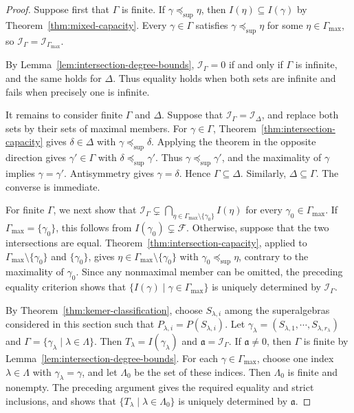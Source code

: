 \documentclass[11pt,reqno]{amsart}
\newcommand{\F}{\mathcal F}
\theoremstyle{definition}
\theoremstyle{remark}
\numberwithin{equation}{section}
\begin{document}
\begin{proof}
Suppose first that $\Gamma$ is finite.
If $\gamma\preceq_{\mathrm{sup}}\eta$, then
$I(\eta)\subseteq I(\gamma)$ by
Theorem~\ref{thm:mixed-capacity}.
Every $\gamma\in\Gamma$ satisfies
$\gamma\preceq_{\mathrm{sup}}\eta$ for some
$\eta\in\Gamma_{\max}$, so
$\mathcal I_\Gamma=\mathcal I_{\Gamma_{\max}}$.


By Lemma~\ref{lem:intersection-degree-bounds},
$\mathcal I_\Gamma=0$ if and only if $\Gamma$ is
infinite, and the same holds for $\Delta$.
Thus equality holds when both sets are infinite and
fails when precisely one is infinite.

It remains to consider finite $\Gamma$ and $\Delta$.
Suppose that $\mathcal I_\Gamma=\mathcal I_\Delta$,
and replace both sets by their sets of maximal members.
For $\gamma\in\Gamma$,
Theorem~\ref{thm:intersection-capacity} gives
$\delta\in\Delta$ with
$\gamma\preceq_{\mathrm{sup}}\delta$.
Applying the theorem in the opposite direction gives
$\gamma'\in\Gamma$ with
$\delta\preceq_{\mathrm{sup}}\gamma'$.
Thus $\gamma\preceq_{\mathrm{sup}}\gamma'$,
and the maximality of $\gamma$ implies
$\gamma=\gamma'$.
Antisymmetry  gives $\gamma=\delta$.
Hence $\Gamma\subseteq\Delta$. Similarly, $\Delta \subseteq \Gamma$.
The converse is immediate.

For finite $\Gamma$, we next show that
$\mathcal I_\Gamma\subsetneq
\bigcap_{\eta\in\Gamma_{\max}\setminus\{\gamma_0\}}I(\eta)$
for every $\gamma_0\in\Gamma_{\max}$.
If $\Gamma_{\max}=\{\gamma_0\}$, this follows from
$I(\gamma_0)\subsetneq\F$.
Otherwise, suppose that the two intersections are equal.
Theorem~\ref{thm:intersection-capacity}, applied to
$\Gamma_{\max}\setminus\{\gamma_0\}$ and
$\{\gamma_0\}$, gives
$\eta\in\Gamma_{\max}\setminus\{\gamma_0\}$ with
$\gamma_0\preceq_{\mathrm{sup}}\eta$,
contrary to the maximality of $\gamma_0$.
Since any nonmaximal member can be omitted,
the preceding equality criterion shows that
$\{I(\gamma)\mid\gamma\in\Gamma_{\max}\}$
is uniquely determined by $\mathcal I_\Gamma$.

By Theorem~\ref{thm:kemer-classification}, choose
$S_{\lambda,i}$ among the superalgebras considered
in this section such that
$P_{\lambda,i}=P(S_{\lambda,i})$.
Let
$\gamma_\lambda=(S_{\lambda,1},\cdots,S_{\lambda,r_\lambda})$
and $\Gamma=\{\gamma_\lambda\mid\lambda\in\Lambda\}$.
Then $T_\lambda=I(\gamma_\lambda)$ and
$\mathfrak a=\mathcal I_\Gamma$.
If $\mathfrak a\ne0$, then $\Gamma$ is finite by
Lemma~\ref{lem:intersection-degree-bounds}.
For each $\gamma\in\Gamma_{\max}$, choose one index
$\lambda\in\Lambda$ with $\gamma_\lambda=\gamma$,
and let $\Lambda_0$ be the set of these indices.
Then $\Lambda_0$ is finite and nonempty.
The preceding argument gives the required equality
and strict inclusions, and shows that
$\{T_\lambda\mid\lambda\in\Lambda_0\}$
is uniquely determined by $\mathfrak a$.


\end{proof}
\end{document}
